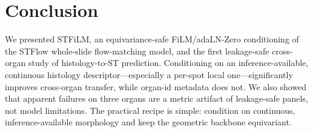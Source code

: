\documentclass[10pt,twocolumn,letterpaper]{article}
\begin{document}
\section{Conclusion}
\label{sec:conclusion}
We presented STFiLM, an equivariance-safe FiLM/adaLN-Zero conditioning of the STFlow
whole-slide flow-matching model, and the first leakage-safe cross-organ study of
histology-to-ST prediction. Conditioning on an inference-available, continuous histology
descriptor---especially a per-spot local one---significantly improves cross-organ transfer,
while organ-id metadata does not. We also showed that
apparent failures on three organs are a metric artifact of leakage-safe panels, not model
limitations. The practical recipe is simple: condition on continuous, inference-available
morphology and keep the geometric backbone equivariant.

{\footnotesize
\setlength{\bibsep}{3.2pt plus 0.3ex}


}
\end{document}
